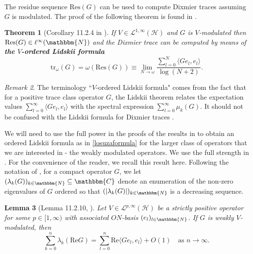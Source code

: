 \documentclass[10pt]{amsart}
\newtheorem{thm}{Theorem}[section]
\newtheorem{lem}[thm]{Lemma}
\theoremstyle{remark}
\newtheorem{remark}[thm]{Remark}
\theoremstyle{definition}
\begin{document}
The residue sequence $\mathrm{Res}(G)$ can be used to compute Dixmier traces assuming $G$ is modulated. The proof of the following theorem is found in \cite{sukolord}.

\begin{thm}[Corollary 11.2.4 in \cite{sukolord}]
If $V\in \mathcal{L}^{1,\infty}({\mathcal{H}})$ and $G$ is $V$-modulated then $\mathrm{Res}(G)\in \ell^\infty({\mathbbm{N}})$ and the Dixmier trace can be computed by means of {\bf the $V$-ordered Lidskii formula}
\begin{equation}
\label{losuzaformula}
{\mathrm{t}\mathrm{r}}_\omega(G)=\omega(\mathrm{Res}(G))\equiv \lim_{N\to \omega}\frac{\sum_{l=0}^N\langle Ge_l,e_l\rangle}{\log(N+2)}.
\end{equation}
\end{thm}

\begin{remark}
The terminology ``$V$-ordered Lidskii formula" comes from the fact that for a positive trace class operator $G$, the Lidskii theorem relates the expectation values $\sum_{l=0}^\infty \langle Ge_l,e_l\rangle$ with the spectral expression $\sum_{l=0}^\infty \mu_k(G)$. It should not be confused with the Lidskii formula for Dixmier traces \cite[Theorem 1]{lidskiitypesesuza}. 
\end{remark}

We will need to use the full power in the proofs of the results in \cite[Chapter 11]{sukolord} to obtain an ordered Lidskii formula as in \eqref{losuzaformula} for the larger class of operators that we are interested in - the weakly modulated operators. We use the full strength in \cite[Lemma 11.2.10]{sukolord}. For the convenience of the reader, we recall this result here. Following the notation of \cite{sukolord}, for a compact operator $G$, we let $(\lambda_k(G))_{k\in {\mathbbm{N}}}\subseteq {\mathbbm{C}}$ denote an enumeration of the non-zero eigenvalues of $G$ ordered so that $(|\lambda_k(G)|)_{k\in {\mathbbm{N}}}$ is a decreasing sequence.

\begin{lem}[Lemma 11.2.10, \cite{sukolord}]
\label{lemma11210}
Let $V\in \mathcal{L}^{p,\infty}({\mathcal{H}})$ be a strictly positive operator for some $p\in [1,\infty)$ with associated $ON$-basis $(e_l)_{l\in {\mathbbm{N}}}$. If $G$ is weakly $V$-modulated, then
$$\sum_{k=0}^n\lambda_k(\mathrm{Re}G)=\sum_{l=0}^n\mathrm{Re}\langle Ge_l,e_l\rangle+O(1)\quad \mbox{as $n\to \infty$}.$$
\end{lem}
\end{document}
